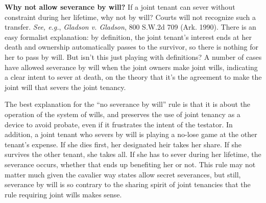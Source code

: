 \item \textbf{Why not allow severance by will?} If a joint tenant can
sever without constraint during her lifetime, why not by will? Courts will not
recognize such a transfer. \textit{See, e.g.}, \emph{Gladson v. Gladson}, 800
S.W.2d 709 (Ark. 1990). There is an easy formalist explanation: by definition,
the joint tenant's interest ends at her death and ownership automatically passes
to the survivor, so there is nothing for her to pass by will. But isn't this
just playing with definitions? A number of cases have allowed severance by will
when the joint owners make joint wills, indicating a clear intent to sever at
death, on the theory that it's the agreement to make the joint will that severs
the joint tenancy.


The best explanation for the ``no severance by will'' rule is that it is about
the operation of the system of wills, and preserves the use of joint tenancy as
a device to avoid probate, even if it frustrates the intent of the testator. In
addition, a joint tenant who severs by will is playing a no-lose game at the
other tenant's expense. If she dies first, her designated heir takes her share.
If she survives the other tenant, she takes all. If she has to sever during her
lifetime, the severance occurs, whether that ends up benefiting her or not.
This rule may not matter much given the cavalier way states allow secret
severances, but still, severance by will is so contrary to the sharing spirit
of joint tenancies that the rule requiring joint wills makes sense.

